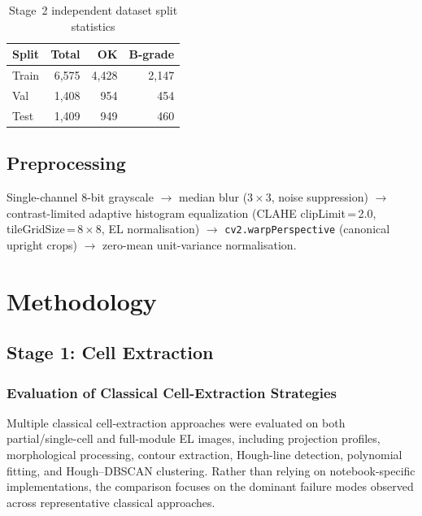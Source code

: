 \documentclass[conference]{IEEEtran}
\begin{document}
\begin{table}[t]
  \caption{Stage~2 independent dataset split statistics}
  \label{tab:datasplit}
  \begin{center}
  \renewcommand{\arraystretch}{0.95}\small
  \begin{tabular}{lrrr}
    \toprule
    \textbf{Split} & \textbf{Total} & \textbf{OK} & \textbf{B-grade}\\
    \midrule
    Train & 6{,}575 & 4{,}428 & 2{,}147\\
    Val   & 1{,}408 &   954   &   454\\
    Test  & 1{,}409 &   949   &   460\\
    \bottomrule
  \end{tabular}
  \end{center}
\end{table}

\subsection{Preprocessing}
Single-channel 8-bit grayscale $\to$ median blur ($3\times3$, noise suppression) $\to$ contrast-limited adaptive histogram equalization (CLAHE clipLimit\,=\,2.0, tileGridSize\,=\,$8\times8$, EL normalisation) $\to$ \texttt{cv2.warpPerspective} (canonical upright crops) $\to$ zero-mean unit-variance normalisation.

\section{Methodology}
\label{sec:method}

\subsection{Stage 1: Cell Extraction}
\label{sec:stage1}

\subsubsection{Evaluation of Classical Cell-Extraction Strategies}

Multiple classical cell-extraction approaches were evaluated on both partial/single-cell and full-module EL images, including projection profiles, morphological processing, contour extraction, Hough-line detection, polynomial fitting, and Hough–DBSCAN clustering. Rather than relying on notebook-specific implementations, the comparison focuses on the dominant failure modes observed across representative classical approaches.
\end{document}
